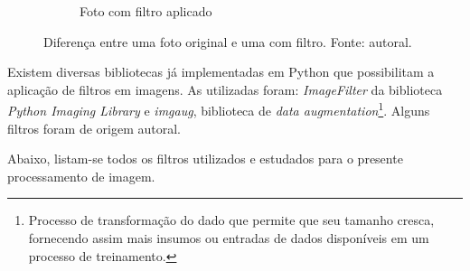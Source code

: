 \begin{figure}[H]
\begin{subfigure}{.5\textwidth}
    \caption{Foto com filtro aplicado}
    \label{fig:image-with-filter}
  \end{subfigure}
  \caption{Diferença entre uma foto original e uma com filtro. Fonte: autoral.}
  \label{fig:side-process-images}
\end{figure}

Existem diversas bibliotecas já implementadas em Python que possibilitam a aplicação de filtros em imagens. As utilizadas foram: \textit{ImageFilter} da biblioteca \textit{Python Imaging Library} e \textit{imgaug}, biblioteca de \textit{data augmentation}\footnote{
  Processo de transformação do dado que permite que seu tamanho cresca, fornecendo assim mais insumos ou entradas de dados disponíveis em um processo de treinamento.
}. Alguns filtros foram de origem autoral.

Abaixo, listam-se todos os filtros utilizados e estudados para o presente processamento de imagem.

